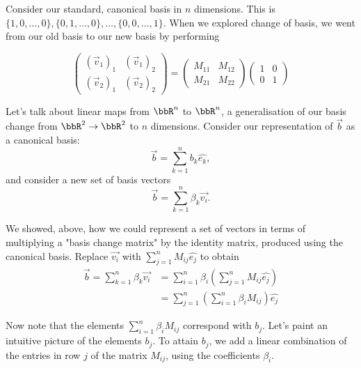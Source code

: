 \documentclass[a4paper, 12pt,oneside,openany]{book}
\begin{document}
Consider our standard, canonical basis in $n$ dimensions. This is $\{1, 0, \dots, 0\}, \{0, 1, \dots, 0\}, \dots, \{0, 0, \dots, 1\}$. When we explored change of basis, we went from our old basis to our new basis by performing

$$\begin{pmatrix} (\vec{v}_1)_1 & (\vec{v}_1)_2 \\ (\vec{v}_2)_1 & (\vec{v}_2)_2 \end{pmatrix} = \begin{pmatrix} M_{11} & M_{12} \\ M_{21} & M_{22} \end{pmatrix} \begin{pmatrix} 1 & 0 \\ 0 & 1 \end{pmatrix}$$


Let's talk about linear maps from $\bbR^n$ to $\bbR^n$, a generalisation of our basis change from $\bbR^2 \to \bbR^2$ to $n$ dimensions. Consider our representation of $\vec{b}$ as a  canonical basis: $$\vec{b} = \sum\limits_{k=1}^n b_k \hat{e_k},$$ and consider a new set of basis vectors $$\vec{b} = \sum\limits_{k=1}^n \beta_k \vec{v_i}.$$ 

We showed, above, how we could represent a set of vectors in terms of multiplying a "basis change matrix" by the identity matrix, produced using the canonical basis. Replace $\vec{v_i}$ with $\sum\limits_{j=1}^n M_{ij} \hat{e_j}$ to obtain \begin{align*}\vec{b} = \sum\limits_{k=1}^n \beta_k \vec{v_i} &= \sum\limits_{i=1}^n \beta_i \left(\sum\limits_{j=1}^n M_{ij} \hat{e_j}\right)  \\ &= \sum\limits_{j=1}^n\left( \sum\limits_{i=1}^n  \beta_i  M_{ij} \right) \hat{e_j} \end{align*}

Now note that the elements $ \sum\limits_{i=1}^n  \beta_i  M_{ij} $ correspond with $b_j$. Let's paint an intuitive picture of the elements $b_j$. To attain $b_j$, we add a linear combination of the entries in row $j$ of the matrix $M_{ij}$, using the coefficients $\beta_i$. 
\end{document}
